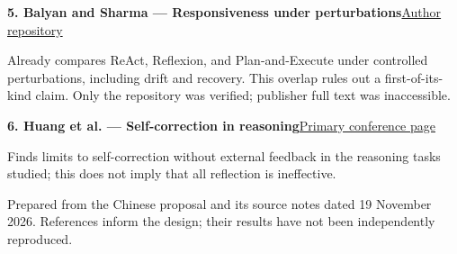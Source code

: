 \documentclass[11pt,a4paper]{article}
\newcommand{\refitem}[3]{\par\textbf{#1}\quad\href{#2}{#3}\par}
\begin{document}
\refitem{5. Balyan and Sharma — Responsiveness under perturbations}{https://github.com/AyushBalyan/Benchmark}{Author repository}
Already compares ReAct, Reflexion, and Plan-and-Execute under controlled perturbations, including drift and recovery. This overlap rules out a first-of-its-kind claim. Only the repository was verified; publisher full text was inaccessible.

\refitem{6. Huang et al. — Self-correction in reasoning}{https://proceedings.iclr.cc/paper_files/paper/2024/hash/8b4add8b0aa8749d80a34ca5d941c355-Abstract-Conference.html}{Primary conference page}
Finds limits to self-correction without external feedback in the reasoning tasks studied; this does not imply that all reflection is ineffective.

\vfill
{\small\color{navy}Prepared from the Chinese proposal and its source notes dated 19 November 2026. References inform the design; their results have not been independently reproduced.}
\end{document}
